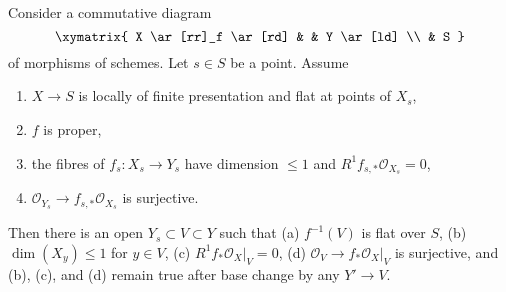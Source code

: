 \begin{lemma}
\label{lemma-h1-fibre-zero-h0-kappa}
Consider a commutative diagram
$$
\xymatrix{
X \ar[rr]_f \ar[rd] & & Y \ar[ld] \\
& S
}
$$
of morphisms of schemes. Let $s \in S$ be a point. Assume
\begin{enumerate}
\item $X \to S$ is locally of finite presentation and flat at
points of $X_s$,
\item $f$ is proper,
\item the fibres of $f_s : X_s \to Y_s$ have dimension $\leq 1$
and $R^1f_{s, *}\mathcal{O}_{X_s} = 0$,
\item $\mathcal{O}_{Y_s} \to f_{s, *}\mathcal{O}_{X_s}$ is surjective.
\end{enumerate}
Then there is an open $Y_s \subset V \subset Y$ such that
(a) $f^{-1}(V)$ is flat over $S$,
(b) $\dim(X_y) \leq 1$ for $y \in V$,
(c) $R^1f_*\mathcal{O}_X|_V = 0$,
(d) $\mathcal{O}_V \to f_*\mathcal{O}_X|_V$
is surjective,
and (b), (c), and (d) remain true after base change by any $Y' \to V$.
\end{lemma}

